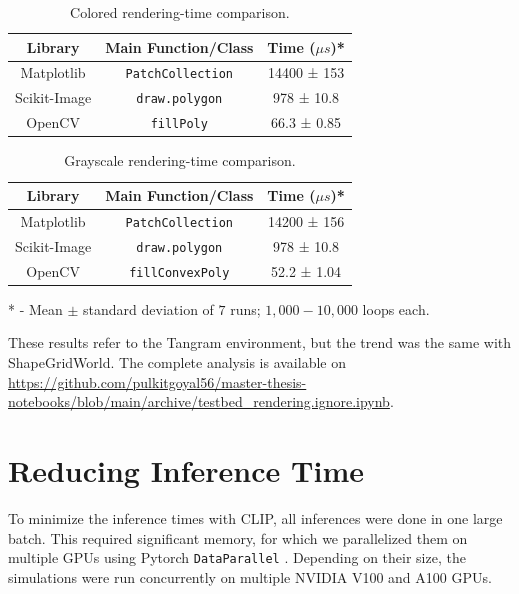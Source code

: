 \begin{table}[H]
    \centering
    \begin{tabular}[t]{@{} c c c @{}}
        \hline
        \textbf{Library} & \textbf{Main Function/Class} & \textbf{Time (\(\mu s\))*}\\
        \hline
        Matplotlib & \texttt{PatchCollection} & 14400 ± 153\\
        Scikit-Image & \texttt{draw.polygon} & 978 ± 10.8\\
        OpenCV & \texttt{fillPoly} & 66.3 ± 0.85\\
        \hline
    \end{tabular}
    \caption{Colored rendering-time comparison.}
    \label{tab:render-time-color}
\end{table}
\begin{table}[H]
    \centering
    \begin{tabular}[t]{@{} c c c @{}}
        \hline
        \textbf{Library} & \textbf{Main Function/Class} & \textbf{Time (\(\mu s\))*}\\
        \hline
        Matplotlib & \texttt{PatchCollection} & 14200 ± 156\\
        Scikit-Image & \texttt{draw.polygon} & 978 ± 10.8\\
        OpenCV & \texttt{fillConvexPoly} & 52.2 ± 1.04\\
        \hline
    \end{tabular}
    \caption{Grayscale rendering-time comparison.}
    \label{tab:render-time-bw}
\end{table}
* - Mean \(\pm\) standard deviation of \(7\) runs; \(1,000 - 10,000\) loops each.

These results refer to the Tangram environment, but the trend was the same with ShapeGridWorld.
The complete analysis is available on \url{https://github.com/pulkitgoyal56/master-thesis-notebooks/blob/main/archive/testbed_rendering.ignore.ipynb}.

\section{Reducing Inference Time}
\label{sec:improving-infer}
To minimize the inference times with CLIP, all inferences were done in one large batch.
This required significant memory, for which we parallelized them on multiple GPUs using Pytorch \texttt{DataParallel} \citep{pytorch}.
Depending on their size, the simulations were run concurrently on multiple NVIDIA V100 and A100 GPUs.

